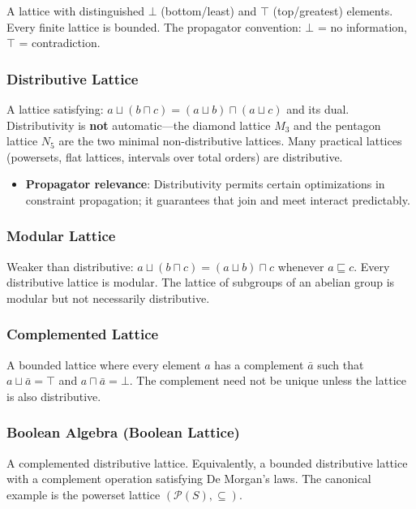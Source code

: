 \documentclass[11pt]{article}
\begin{document}
A lattice with distinguished \(\bot\) (bottom/least) and \(\top\) (top/greatest)
elements. Every finite lattice is bounded. The propagator convention: \(\bot\) = no
information, \(\top\) = contradiction.
\subsubsection{Distributive Lattice}
\label{sec:orgb00a646}

A lattice satisfying: \(a \sqcup (b \sqcap c) = (a \sqcup b) \sqcap (a \sqcup c)\)
and its dual. Distributivity is \textbf{not} automatic---the diamond lattice \(M_3\) and
the pentagon lattice \(N_5\) are the two minimal non-distributive lattices. Many
practical lattices (powersets, flat lattices, intervals over total orders) are
distributive.

\begin{itemize}
\item \textbf{Propagator relevance}: Distributivity permits certain optimizations in
constraint propagation; it guarantees that join and meet interact predictably.
\end{itemize}
\subsubsection{Modular Lattice}
\label{sec:org3f41f18}

Weaker than distributive: \(a \sqcup (b \sqcap c) = (a \sqcup b) \sqcap c\)
whenever \(a \sqsubseteq c\). Every distributive lattice is modular. The lattice of
subgroups of an abelian group is modular but not necessarily distributive.
\subsubsection{Complemented Lattice}
\label{sec:org0daf4ea}

A bounded lattice where every element \(a\) has a complement \(\bar{a}\) such that
\(a \sqcup \bar{a} = \top\) and \(a \sqcap \bar{a} = \bot\). The complement need not
be unique unless the lattice is also distributive.
\subsubsection{Boolean Algebra (Boolean Lattice)}
\label{sec:org82d50ec}

A complemented distributive lattice. Equivalently, a bounded distributive lattice
with a complement operation satisfying De Morgan's laws. The canonical example is
the powerset lattice \((\mathcal{P}(S), \subseteq)\).
\end{document}
